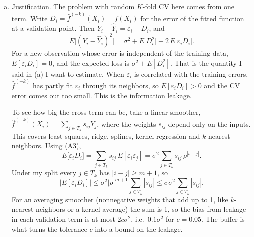 \documentclass[12pt,letterpaper, onecolumn]{exam}
\begin{document}
\begin{questions}
\begin{solution}
\begin{enumerate}[(a)]
            \item Justification. The problem with random $K$-fold CV here comes from one term. Write $D_i = \hat f^{(-k)}(X_i) - f(X_i)$ for the error of the fitted function at a validation point. Then $Y_i - \hat Y_i = \varepsilon_i - D_i$, and
            \begin{equation*}
                E\bigl[(Y_i-\hat Y_i)^2\bigr] = \sigma^2 + E\bigl[D_i^2\bigr] - 2\,E\bigl[\varepsilon_i D_i\bigr].
            \end{equation*}
            For a new observation whose error is independent of the training data, $E[\varepsilon_i D_i] = 0$, and the expected loss is $\sigma^2 + E[D_i^2]$. That is the quantity I said in (a) I want to estimate. When $\varepsilon_i$ is correlated with the training errors, $\hat f^{(-k)}$ has partly fit $\varepsilon_i$ through its neighbors, so $E[\varepsilon_i D_i]>0$ and the CV error comes out too small. This is the information leakage.

            To see how big the cross term can be, take a linear smoother, $\hat f^{(-k)}(X_i) = \sum_{j\in T_k} s_{ij}Y_j$, where the weights $s_{ij}$ depend only on the inputs. This covers least squares, ridge, splines, kernel regression and $k$-nearest neighbors. Using (A3),
            \begin{equation*}
                E\bigl[\varepsilon_i D_i\bigr] = \sum_{j\in T_k} s_{ij}\,E[\varepsilon_i\varepsilon_j] = \sigma^2\sum_{j\in T_k} s_{ij}\,\rho^{|i-j|}.
            \end{equation*}
            Under my split every $j\in T_k$ has $|i-j|\ge m+1$, so
            \begin{equation*}
                \bigl|E[\varepsilon_i D_i]\bigr| \le \sigma^2|\rho|^{m+1}\sum_{j\in T_k}|s_{ij}| \le c\,\sigma^2\sum_{j\in T_k}|s_{ij}|.
            \end{equation*}
            For an averaging smoother (nonnegative weights that add up to 1, like $k$-nearest neighbors or a kernel average) the sum is 1, so the bias from leakage in each validation term is at most $2c\sigma^2$, i.e.\ $0.1\sigma^2$ for $c=0.05$. The buffer is what turns the tolerance $c$ into a bound on the leakage.


\end{enumerate}
\end{solution}
\end{questions}
\end{document}

